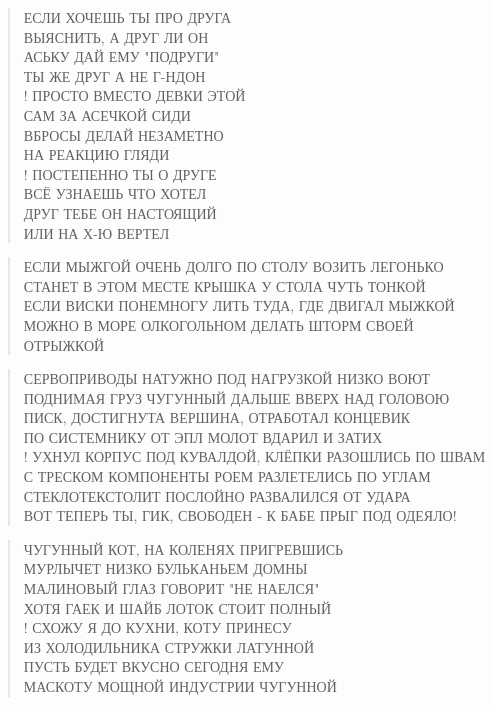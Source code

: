 \poemtitle{***}
\begin{verse}
ЕСЛИ ХОЧЕШЬ ТЫ ПРО ДРУГА\\
ВЫЯСНИТЬ, А ДРУГ ЛИ ОН\\
АСЬКУ ДАЙ ЕМУ "ПОДРУГИ"\\
ТЫ ЖЕ ДРУГ А НЕ Г-НДОН\\!
ПРОСТО ВМЕСТО ДЕВКИ ЭТОЙ\\
САМ ЗА АСЕЧКОЙ СИДИ\\
ВБРОСЫ ДЕЛАЙ НЕЗАМЕТНО\\
НА РЕАКЦИЮ ГЛЯДИ\\!
ПОСТЕПЕННО ТЫ О ДРУГЕ\\
ВСЁ УЗНАЕШЬ ЧТО ХОТЕЛ\\
ДРУГ ТЕБЕ ОН НАСТОЯЩИЙ\\
ИЛИ НА Х-Ю ВЕРТЕЛ
\end{verse}

\poemtitle{***}
\begin{verse}
ЕСЛИ МЫЖГОЙ ОЧЕНЬ ДОЛГО ПО СТОЛУ ВОЗИТЬ ЛЕГОНЬКО\\
СТАНЕТ В ЭТОМ МЕСТЕ КРЫШКА У СТОЛА ЧУТЬ ТОНКОЙ\\
ЕСЛИ ВИСКИ ПОНЕМНОГУ ЛИТЬ ТУДА, ГДЕ ДВИГАЛ МЫЖКОЙ\\
МОЖНО В МОРЕ ОЛКОГОЛЬНОМ ДЕЛАТЬ ШТОРМ СВОЕЙ ОТРЫЖКОЙ
\end{verse}

\poemtitle{***}
\begin{verse}
СЕРВОПРИВОДЫ НАТУЖНО ПОД НАГРУЗКОЙ НИЗКО ВОЮТ\\
ПОДНИМАЯ ГРУЗ ЧУГУННЫЙ ДАЛЬШЕ ВВЕРХ НАД ГОЛОВОЮ\\
ПИСК, ДОСТИГНУТА ВЕРШИНА, ОТРАБОТАЛ КОНЦЕВИК\\
ПО СИСТЕМНИКУ ОТ ЭПЛ МОЛОТ ВДАРИЛ И ЗАТИХ\\!
УХНУЛ КОРПУС ПОД КУВАЛДОЙ, КЛЁПКИ РАЗОШЛИСЬ ПО ШВАМ\\
С ТРЕСКОМ КОМПОНЕНТЫ РОЕМ РАЗЛЕТЕЛИСЬ ПО УГЛАМ\\
СТЕКЛОТЕКСТОЛИТ ПОСЛОЙНО РАЗВАЛИЛСЯ ОТ УДАРА\\
ВОТ ТЕПЕРЬ ТЫ, ГИК, СВОБОДЕН - К БАБЕ ПРЫГ ПОД ОДЕЯЛО!
\end{verse}

\poemtitle{***}
\begin{verse}
ЧУГУННЫЙ КОТ, НА КОЛЕНЯХ ПРИГРЕВШИСЬ\\
МУРЛЫЧЕТ НИЗКО БУЛЬКАНЬЕМ ДОМНЫ\\
МАЛИНОВЫЙ ГЛАЗ ГОВОРИТ "НЕ НАЕЛСЯ"\\
ХОТЯ ГАЕК И ШАЙБ ЛОТОК СТОИТ ПОЛНЫЙ\\!
СХОЖУ Я ДО КУХНИ, КОТУ ПРИНЕСУ\\
ИЗ ХОЛОДИЛЬНИКА СТРУЖКИ ЛАТУННОЙ\\
ПУСТЬ БУДЕТ ВКУСНО СЕГОДНЯ ЕМУ\\
МАСКОТУ МОЩНОЙ ИНДУСТРИИ ЧУГУННОЙ
\end{verse}

